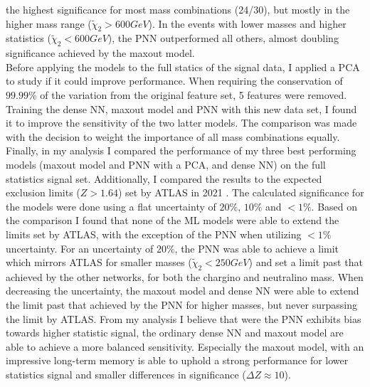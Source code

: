 the highest significance for most mass combinations (24/30), but mostly in the higher mass range ($\tilde{\chi}_2>600GeV$). In the events with lower masses and higher statistics ($\tilde{\chi}_2<600GeV$), the \ac{PNN} outperformed all others, 
almost doubling significance achieved by the maxout model.
\\
Before applying the models to the full statics of the signal data, I applied a \ac{PCA} to study if it could improve performance. When requiring the conservation of $99.99\%$ of the variation from the original feature set, 5 features were removed.
Training the dense \ac{NN}, maxout model and \ac{PNN} with this new data set, I found it to improve the sensitivity of the two latter models. The comparison was made with the decision to weight the importance of all mass combinations equally.
\\
Finally, in my analysis I compared the performance of my three best performing models (maxout model and \ac{PNN} with a \ac{PCA}, and dense \ac{NN}) on the full statistics signal set. Additionally, I compared the results to the expected exclusion 
limits ($Z>1.64$) set by \ac{ATLAS} in 2021 \cite{atlas_search_2021}. The calculated significance for the models were done using a flat uncertainty of $20\%$, $10\%$ and $<1\%$. Based on the comparison I found that none of the \ac{ML} models were 
able to extend the limits set by \ac{ATLAS}, with the exception of the \ac{PNN} when utilizing $<1\%$ uncertainty. For an uncertainty of $20\%$, the \ac{PNN} was able to achieve a limit which mirrors \ac{ATLAS} for smaller masses ($\tilde{\chi}_2<250GeV$)
and set a limit past that achieved by the other networks, for both the chargino and neutralino mass. When decreasing the uncertainty, the maxout model and dense \ac{NN} were able to extend the limit past that achieved by the \ac{PNN} for higher masses, but never 
surpassing the limit by \ac{ATLAS}. From my analysis I believe that were the \ac{PNN} exhibits bias towards higher statistic signal, the ordinary dense \ac{NN} and maxout model are able to achieve a more balanced sensitivity. Especially the maxout model, 
with an impressive long-term memory is able to uphold a strong performance for lower statistics signal and smaller differences in significance ($\Delta Z \approx 10$).

